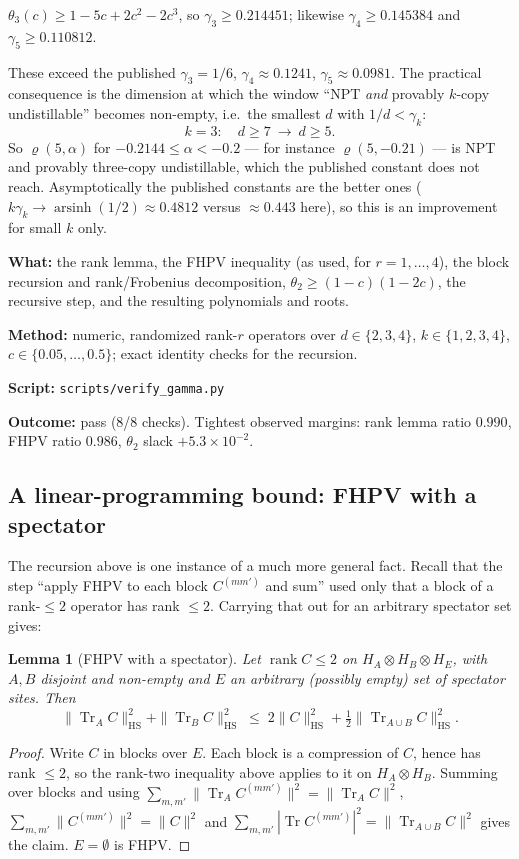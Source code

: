 \documentclass[11pt]{article}
\theoremstyle{definition}
\theoremstyle{plain}
\newtheorem{lemma}{Lemma}
\newcommand{\HS}{\mathrm{HS}}
\newcommand{\Tr}{\operatorname{Tr}}
\begin{document}
\begin{corollary}
$\theta_3(c)\ge1-5c+2c^2-2c^3$, so $\gamma_3\ge0.214451$; likewise
$\gamma_4\ge0.145384$ and $\gamma_5\ge0.110812$.
\end{corollary}

These exceed the published $\gamma_3=1/6$, $\gamma_4\approx0.1241$,
$\gamma_5\approx0.0981$. The practical consequence is the dimension at which the
window ``NPT \emph{and} provably $k$-copy undistillable'' becomes non-empty, i.e.\ the
smallest $d$ with $1/d<\gamma_k$:
\[
k=3:\quad d\ge7\ \longrightarrow\ d\ge5 .
\]
So $\varrho(5,\alpha)$ for $-0.2144\le\alpha<-0.2$ --- for instance $\varrho(5,-0.21)$ ---
is NPT and provably three-copy undistillable, which the published constant does not reach.
Asymptotically the published constants are the better ones
($k\gamma_k\to\operatorname{arsinh}(1/2)\approx0.4812$ versus $\approx0.443$ here), so this
is an improvement for small $k$ only.

\begin{verification}
\textbf{What:} the rank lemma, the FHPV inequality (as used, for $r=1,\dots,4$), the block
recursion and rank/Frobenius decomposition, $\theta_2\ge(1-c)(1-2c)$, the recursive step,
and the resulting polynomials and roots.

\textbf{Method:} numeric, randomized rank-$r$ operators over $d\in\{2,3,4\}$,
$k\in\{1,2,3,4\}$, $c\in\{0.05,\dots,0.5\}$; exact identity checks for the recursion.

\textbf{Script:} \texttt{scripts/verify\_gamma.py}

\textbf{Outcome:} pass (8/8 checks). Tightest observed margins: rank lemma ratio $0.990$,
FHPV ratio $0.986$, $\theta_2$ slack $+5.3\times10^{-2}$.
\end{verification}

\subsection{A linear-programming bound: FHPV with a spectator}

The recursion above is one instance of a much more general fact. Recall that the step
``apply FHPV to each block $C^{(mm')}$ and sum'' used only that a block of a rank-$\le2$
operator has rank $\le2$. Carrying that out for an arbitrary spectator set gives:

\begin{lemma}[FHPV with a spectator]
\label{lem:spectator}
Let $\operatorname{rank}C\le2$ on $H_A\otimes H_B\otimes H_E$, with $A,B$ disjoint and
non-empty and $E$ an arbitrary (possibly empty) set of spectator sites. Then
\[
\|\Tr_AC\|_\HS^2+\|\Tr_BC\|_\HS^2\;\le\;2\|C\|_\HS^2+\tfrac12\|\Tr_{A\cup B}C\|_\HS^2 .
\]
\end{lemma}
\begin{proof}
Write $C$ in blocks over $E$. Each block is a compression of $C$, hence has rank $\le2$, so
the rank-two inequality above applies to it on $H_A\otimes H_B$. Summing over blocks and using
$\sum_{m,m'}\|\Tr_AC^{(mm')}\|^2=\|\Tr_AC\|^2$, $\sum_{m,m'}\|C^{(mm')}\|^2=\|C\|^2$ and
$\sum_{m,m'}|\Tr C^{(mm')}|^2=\|\Tr_{A\cup B}C\|^2$ gives the claim. $E=\emptyset$ is FHPV.
\end{proof}
\end{document}
